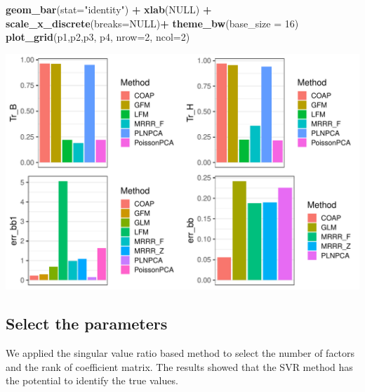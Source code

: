\documentclass[
]{article}
\newenvironment{Shaded}{\begin{snugshade}}{\end{snugshade}}
\newcommand{\DataTypeTok}[1]{\textcolor[rgb]{0.13,0.29,0.53}{#1}}
\newcommand{\DecValTok}[1]{\textcolor[rgb]{0.00,0.00,0.81}{#1}}
\newcommand{\KeywordTok}[1]{\textcolor[rgb]{0.13,0.29,0.53}{\textbf{#1}}}
\newcommand{\NormalTok}[1]{#1}
\newcommand{\OperatorTok}[1]{\textcolor[rgb]{0.81,0.36,0.00}{\textbf{#1}}}
\newcommand{\OtherTok}[1]{\textcolor[rgb]{0.56,0.35,0.01}{#1}}
\newcommand{\StringTok}[1]{\textcolor[rgb]{0.31,0.60,0.02}{#1}}
\begin{document}
\begin{Shaded}
\begin{Highlighting}[]
\StringTok{  }\KeywordTok{geom_bar}\NormalTok{(}\DataTypeTok{stat=}\StringTok{"identity"}\NormalTok{) }\OperatorTok{+}\StringTok{ }\KeywordTok{xlab}\NormalTok{(}\OtherTok{NULL}\NormalTok{) }\OperatorTok{+}\StringTok{ }\KeywordTok{scale_x_discrete}\NormalTok{(}\DataTypeTok{breaks=}\OtherTok{NULL}\NormalTok{)}\OperatorTok{+}\StringTok{ }\KeywordTok{theme_bw}\NormalTok{(}\DataTypeTok{base_size =} \DecValTok{16}\NormalTok{)}
\KeywordTok{plot_grid}\NormalTok{(p1,p2,p3, p4, }\DataTypeTok{nrow=}\DecValTok{2}\NormalTok{, }\DataTypeTok{ncol=}\DecValTok{2}\NormalTok{)}
\end{Highlighting}
\end{Shaded}

\includegraphics{COAPsimu_files/figure-latex/unnamed-chunk-17-1.pdf}

\hypertarget{select-the-parameters}{%
\subsection{Select the parameters}\label{select-the-parameters}}

We applied the singular value ratio based method to select the number of
factors and the rank of coefficient matrix. The results showed that the
SVR method has the potential to identify the true values.
\end{document}
